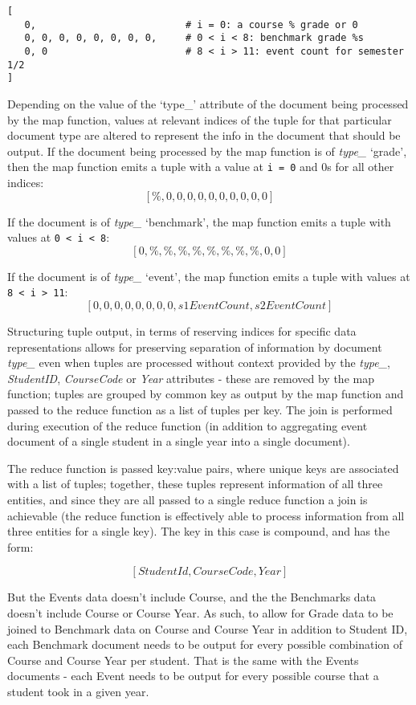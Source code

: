 \begin{verbatim}
[
   0,                          # i = 0: a course % grade or 0
   0, 0, 0, 0, 0, 0, 0, 0,     # 0 < i < 8: benchmark grade %s
   0, 0                        # 8 < i > 11: event count for semester 1/2
]
\end{verbatim}

Depending on the value of the `type\_' attribute of the document being processed by the map function, values at relevant indices of the tuple for that particular document type are altered to represent the info in the document that should be output. If the document being processed by the map function is of \textit{type\_} ‘grade’, then the map function emits a tuple with a value at \texttt{i = 0} and 0s for all other indices: \[[\%, 0, 0, 0, 0, 0, 0, 0, 0, 0, 0]\]

If the document is of \textit{type\_} `benchmark', the map function emits a tuple with values at \texttt{0 < i < 8}: \[[0, \%, \%, \%, \%, \%, \%, \%, \%, 0, 0]\]

If the document is of \textit{type\_} ‘event’, the map function emits a tuple with values at \texttt{8 < i > 11}: \[[0, 0, 0, 0, 0, 0, 0, 0, s1EventCount, s2EventCount]\]

Structuring tuple output, in terms of reserving indices for specific data representations allows for preserving separation of information by document \textit{type\_} even when tuples are processed without context provided by the \textit{type\_}, \textit{StudentID}, \textit{CourseCode} or \textit{Year} attributes - these are removed by the map function; tuples are grouped by common key as output by the map function and passed to the reduce function as a list of tuples per key. The join is performed during execution of the reduce function (in addition to aggregating event document of a single student in a single year into a single document).

The reduce function is passed key:value pairs, where unique keys are associated with a list of tuples; together, these tuples represent information of all three entities, and since they are all passed to a single reduce function a join is achievable (the reduce function is effectively able to process information from all three entities for a single key). The key in this case is compound, and has the form:

\[[StudentId,CourseCode,Year]\]

But the Events data doesn't include Course, and the the Benchmarks data doesn't include Course or Course Year. As such, to allow for Grade data to be joined to Benchmark data on Course and Course Year in addition to Student ID, each Benchmark document needs to be output for every possible combination of Course and Course Year per student. That is the same with the Events documents - each Event needs to be output for every possible course that a student took in a given year.

